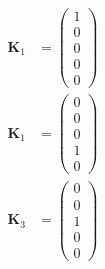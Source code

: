\documentclass{article}
\begin{document}
\setcounter{subsubsection}{32}
\subsubsection{}

\begin{align*}
  \mathbf{K}_1 & = \begin{pmatrix}
                     1 \\
                     0 \\
                     0 \\
                     0 \\
                     0
                   \end{pmatrix} \\
  \mathbf{K}_1 & = \begin{pmatrix}
                     0 \\
                     0 \\
                     0 \\
                     1 \\
                     0
                   \end{pmatrix} \\
  \mathbf{K}_3 & = \begin{pmatrix}
                     0 \\
                     0 \\
                     1 \\
                     0 \\
                     0
                   \end{pmatrix} \\
\end{align*}

\setcounter{subsubsection}{34}
\subsubsection{}
\end{document}
